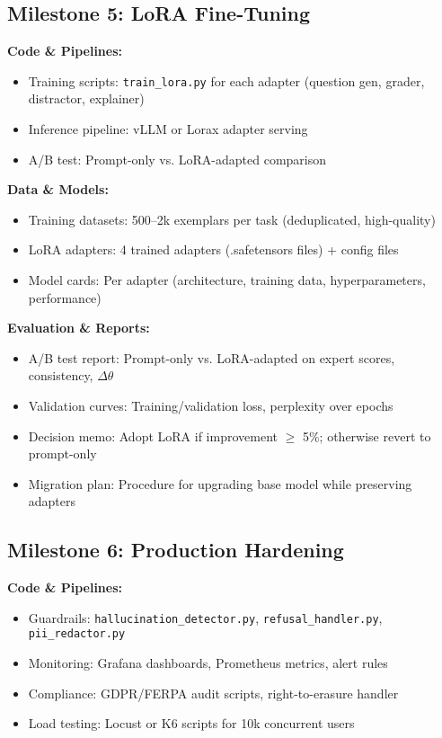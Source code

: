 \documentclass[11pt,letterpaper]{article}
\begin{document}
\subsection{Milestone 5: LoRA Fine-Tuning}\label{subsec:deliverable-milestone-5}

\textbf{Code \& Pipelines:}
\begin{itemize}
\item Training scripts: \texttt{train\_lora.py} for each adapter (question gen, grader, distractor, explainer)
\item Inference pipeline: vLLM or Lorax adapter serving
\item A/B test: Prompt-only vs. LoRA-adapted comparison
\end{itemize}

\textbf{Data \& Models:}
\begin{itemize}
\item Training datasets: 500--2k exemplars per task (deduplicated, high-quality)
\item LoRA adapters: 4 trained adapters (.safetensors files) + config files
\item Model cards: Per adapter (architecture, training data, hyperparameters, performance)
\end{itemize}

\textbf{Evaluation \& Reports:}
\begin{itemize}
\item A/B test report: Prompt-only vs. LoRA-adapted on expert scores, consistency, $\Delta\theta$
\item Validation curves: Training/validation loss, perplexity over epochs
\item Decision memo: Adopt LoRA if improvement $\geq$ 5\%; otherwise revert to prompt-only
\item Migration plan: Procedure for upgrading base model while preserving adapters
\end{itemize}

\subsection{Milestone 6: Production Hardening}\label{subsec:deliverable-milestone-6}

\textbf{Code \& Pipelines:}
\begin{itemize}
\item Guardrails: \texttt{hallucination\_detector.py}, \texttt{refusal\_handler.py}, \texttt{pii\_redactor.py}
\item Monitoring: Grafana dashboards, Prometheus metrics, alert rules
\item Compliance: GDPR/FERPA audit scripts, right-to-erasure handler
\item Load testing: Locust or K6 scripts for 10k concurrent users
\end{itemize}
\end{document}
